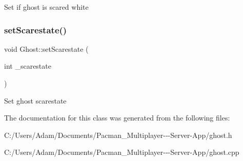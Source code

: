 Set if ghost is scared white \mbox{\label{class_ghost_ac57d9cbbba11f9c1b2bad35de42b417a}} 
\subsubsection{\texorpdfstring{set\+Scarestate()}{setScarestate()}}
{\footnotesize\ttfamily void Ghost\+::set\+Scarestate (\begin{DoxyParamCaption}\item[{int}]{\+\_\+scarestate }\end{DoxyParamCaption})\hspace{0.3cm}{\ttfamily [inline]}}

Set ghost scarestate 

The documentation for this class was generated from the following files\+:\begin{DoxyCompactItemize}
\item 
C\+:/\+Users/\+Adam/\+Documents/\+Pacman\+\_\+\+Multiplayer-\/-\/-\/\+Server-\/\+App/ghost.\+h\item 
C\+:/\+Users/\+Adam/\+Documents/\+Pacman\+\_\+\+Multiplayer-\/-\/-\/\+Server-\/\+App/ghost.\+cpp\end{DoxyCompactItemize}
